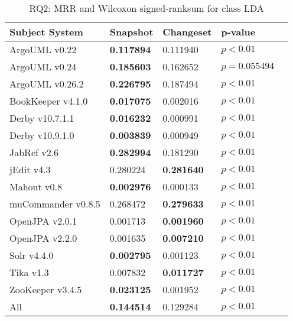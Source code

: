 
\begin{table}[t]
\renewcommand{\arraystretch}{1.3}
\footnotesize
\centering
\caption{RQ2: MRR and Wilcoxon signed-ranksum for class LDA}
\begin{tabular}{l|ll|ll}
   \toprule
    Subject System & Snapshot & Changeset & p-value  \\
    \midrule

ArgoUML v0.22 & {\bf 0.117894 } & 0.111940 & $p < 0.01$ \\
ArgoUML v0.24 & {\bf 0.185603 } & 0.162652 & $p = 0.055494$ \\
ArgoUML v0.26.2 & {\bf 0.226795 } & 0.187494 & $p < 0.01$ \\
BookKeeper v4.1.0 & {\bf 0.017075 } & 0.002016 & $p < 0.01$ \\
Derby v10.7.1.1 & {\bf 0.016232 } & 0.000991 & $p < 0.01$ \\
Derby v10.9.1.0 & {\bf 0.003839 } & 0.000949 & $p < 0.01$ \\
JabRef v2.6 & {\bf 0.282994 } & 0.181290 & $p < 0.01$ \\
jEdit v4.3 & 0.280224 & {\bf 0.281640 } & $p < 0.01$ \\
Mahout v0.8 & {\bf 0.002976 } & 0.000133 & $p < 0.01$ \\
muCommander v0.8.5 & 0.268472 & {\bf 0.279633 } & $p < 0.01$ \\
OpenJPA v2.0.1 & 0.001713 & {\bf 0.001960 } & $p < 0.01$ \\
OpenJPA v2.2.0 & 0.001635 & {\bf 0.007210 } & $p < 0.01$ \\
Solr v4.4.0 & {\bf 0.002795 } & 0.001123 & $p < 0.01$ \\
Tika v1.3 & 0.007832 & {\bf 0.011727 } & $p < 0.01$ \\
ZooKeeper v3.4.5 & {\bf 0.023125 } & 0.001952 & $p < 0.01$ \\
\midrule
All & {\bf 0.144514 } & 0.129284 & $p < 0.01$ \\

    \bottomrule
\end{tabular}
\label{table:rq2:class:lda}
\end{table}


